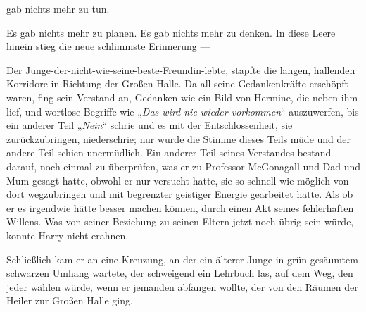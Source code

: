 
 gab nichts mehr zu tun.

\hplettrineextrapara


Es gab nichts mehr zu planen. Es gab nichts mehr zu denken. In diese Leere hinein stieg die neue schlimmste Erinnerung —

Der Junge-der-nicht-wie-seine-beste-Freundin-lebte, stapfte die langen, hallenden Korridore in Richtung der Großen Halle. Da all seine Gedankenkräfte erschöpft waren, fing sein Verstand an, Gedanken wie ein Bild von Hermine, die neben ihm lief, und wortlose Begriffe wie
„\emph{Das wird nie wieder vorkommen}“ auszuwerfen, bis ein anderer Teil
„\emph{Nein}“ schrie und es mit der Entschlossenheit, sie zurückzubringen, niederschrie; nur wurde die Stimme dieses Teils müde und der andere Teil schien unermüdlich. Ein anderer Teil seines Verstandes bestand darauf, noch einmal zu überprüfen, was er zu Professor McGonagall und Dad und Mum gesagt hatte, obwohl er nur versucht hatte, sie so schnell wie möglich von dort wegzubringen und mit begrenzter geistiger Energie gearbeitet hatte. Als ob er es irgendwie hätte besser machen können, durch einen Akt seines fehlerhaften Willens. Was von seiner Beziehung zu seinen Eltern jetzt noch übrig sein würde, konnte Harry nicht erahnen.

Schließlich kam er an eine Kreuzung, an der ein älterer Junge in grün-gesäumtem schwarzen Umhang wartete, der schweigend ein Lehrbuch las, auf dem Weg, den jeder wählen würde, wenn er jemanden abfangen wollte, der von den Räumen der Heiler zur Großen Halle ging.

